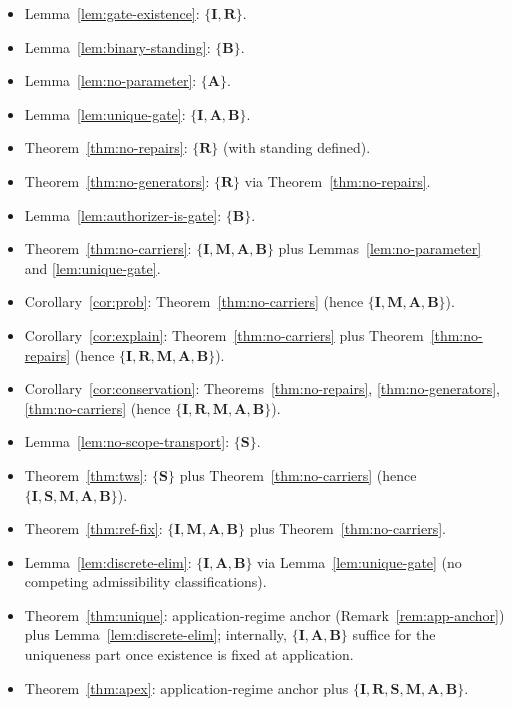 \documentclass[12pt]{article}
\begin{document}
\begin{itemize}[leftmargin=2.2em]
\item Lemma~\ref{lem:gate-existence}: $\{\mathbf{I},\mathbf{R}\}$.
\item Lemma~\ref{lem:binary-standing}: $\{\mathbf{B}\}$.
\item Lemma~\ref{lem:no-parameter}: $\{\mathbf{A}\}$.
\item Lemma~\ref{lem:unique-gate}: $\{\mathbf{I},\mathbf{A},\mathbf{B}\}$.
\item Theorem~\ref{thm:no-repairs}: $\{\mathbf{R}\}$ (with standing defined).
\item Theorem~\ref{thm:no-generators}: $\{\mathbf{R}\}$ via Theorem~\ref{thm:no-repairs}.
\item Lemma~\ref{lem:authorizer-is-gate}: $\{\mathbf{B}\}$.
\item Theorem~\ref{thm:no-carriers}: $\{\mathbf{I},\mathbf{M},\mathbf{A},\mathbf{B}\}$ plus Lemmas~\ref{lem:no-parameter} and \ref{lem:unique-gate}.
\item Corollary~\ref{cor:prob}: Theorem~\ref{thm:no-carriers} (hence $\{\mathbf{I},\mathbf{M},\mathbf{A},\mathbf{B}\}$).
\item Corollary~\ref{cor:explain}: Theorem~\ref{thm:no-carriers} plus Theorem~\ref{thm:no-repairs} (hence $\{\mathbf{I},\mathbf{R},\mathbf{M},\mathbf{A},\mathbf{B}\}$).
\item Corollary~\ref{cor:conservation}: Theorems~\ref{thm:no-repairs}, \ref{thm:no-generators}, \ref{thm:no-carriers} (hence $\{\mathbf{I},\mathbf{R},\mathbf{M},\mathbf{A},\mathbf{B}\}$).
\item Lemma~\ref{lem:no-scope-transport}: $\{\mathbf{S}\}$.
\item Theorem~\ref{thm:tws}: $\{\mathbf{S}\}$ plus Theorem~\ref{thm:no-carriers} (hence $\{\mathbf{I},\mathbf{S},\mathbf{M},\mathbf{A},\mathbf{B}\}$).
\item Theorem~\ref{thm:ref-fix}: $\{\mathbf{I},\mathbf{M},\mathbf{A},\mathbf{B}\}$ plus Theorem~\ref{thm:no-carriers}.
\item Lemma~\ref{lem:discrete-elim}: $\{\mathbf{I},\mathbf{A},\mathbf{B}\}$ via Lemma~\ref{lem:unique-gate} (no competing admissibility classifications).
\item Theorem~\ref{thm:unique}: application-regime anchor (Remark~\ref{rem:app-anchor}) plus Lemma~\ref{lem:discrete-elim}; internally, $\{\mathbf{I},\mathbf{A},\mathbf{B}\}$ suffice for the uniqueness part once existence is fixed at application.
\item Theorem~\ref{thm:apex}: application-regime anchor plus $\{\mathbf{I},\mathbf{R},\mathbf{S},\mathbf{M},\mathbf{A},\mathbf{B}\}$.
\end{itemize}
\end{document}

